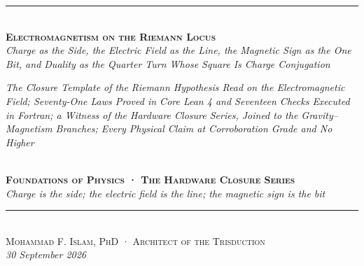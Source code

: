 \documentclass[10pt]{article}
\begin{document}
\begin{center}
{\color{accent}\rule{0.6\textwidth}{0.8pt}}\\[10pt]
{\bfseries\scshape\fontsize{19}{23}\selectfont Electromagnetism on the
Riemann Locus}\\[7pt]
{\itshape\large Charge as the Side, the Electric Field as the Line, the
Magnetic Sign as the One Bit, and Duality as the Quarter Turn Whose
Square Is Charge Conjugation}\\[6pt]
\parbox{0.86\textwidth}{\centering\small\itshape\color{faint} The
Closure Template of the Riemann Hypothesis Read on the Electromagnetic
Field; Seventy-One Laws Proved in Core Lean 4 and Seventeen Checks
Executed in Fortran; a Witness of the Hardware Closure Series, Joined to
the Gravity--Magnetism Branches; Every Physical Claim at Corroboration
Grade and No Higher}\\[8pt]
{\footnotesize\color{accent}\scshape\bfseries Foundations of Physics ·
The Hardware Closure Series}\\[3pt]
{\itshape\color{deep}\small Charge is the side; the electric field is
the line; the magnetic sign is the bit}\\[9pt]
{\color{accent}\rule{0.6\textwidth}{0.8pt}}\\[10pt]
{\scshape Mohammad F. Islam, PhD · Architect of the Trisduction}\\[2pt]

{\itshape\color{faint}\small 30 September 2026}\\[12pt]
\end{center}
\noindent{\color{accent}\rule{\textwidth}{0.6pt}}\\[2pt]
\end{document}
